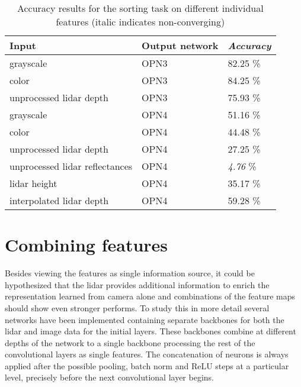 
\begin{table}[]
\centering
\caption{Accuracy results for the sorting task on different individual features (italic indicates non-converging)}
\label{tab:indiv_results}
\begin{tabular}{|p{7.5cm}|p{2cm}|p{2cm}|}
\hline
\textbf{Input}                                                          & \textbf{Output network} & \textit{\textbf{Accuracy}} \\ \hline
grayscale                                                               & OPN3                    & 82.25 \%                   \\ \hline
color                                                                   & OPN3                    & 84.25 \%                   \\ \hline
unprocessed lidar depth                                                 & OPN3                    & 75.93 \%                   \\ \hline
grayscale                                                               & OPN4                    & 51.16 \%                   \\ \hline
color                                                                   & OPN4                    & 44.48 \%                   \\ \hline
unprocessed lidar depth                                                 & OPN4                    & 27.25 \%                   \\ \hline
unprocessed lidar reflectances                                          & OPN4                    & \textit{4.76} \%                   \\ \hline
lidar height                                                            & OPN4                    & 35.17 \%                   \\ \hline
interpolated lidar depth                                                & OPN4                    & 59.28 \%                   \\ \hline
\end{tabular}
\end{table}

\section{Combining features}
Besides viewing the features as single information source, it could be hypothesized that the lidar provides additional information to enrich the representation learned from camera alone and combinations of the feature maps should show even stronger performs. To study this in more detail several networks have been implemented containing separate backbones for both the lidar and image data for the initial layers. These backbones combine at different depths of the network to a single backbone processing the rest of the convolutional layers as single features. The concatenation of neurons is always applied after the possible pooling, batch norm and ReLU steps at a particular level, precisely before the next convolutional layer begins.

